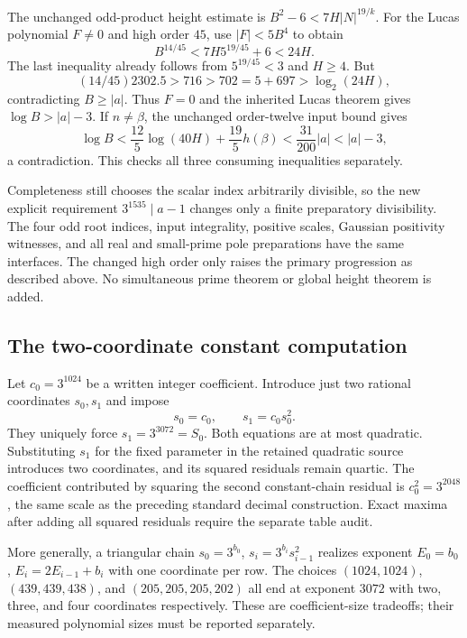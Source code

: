 The unchanged odd-product height estimate is
$B^2-6<7H|N|^{19/k}$. For the Lucas polynomial $F\ne0$ and high
order $45$, use $|F|<5B^4$ to obtain
\[
 B^{14/45}<7H5^{19/45}+6<24H.
\]
The last inequality already follows from $5^{19/45}<3$ and $H\ge4$.
But
\[
 (14/45)2302.5>716>702=5+697>\log_2(24H),
\]
contradicting $B\ge|a|$. Thus $F=0$ and the inherited Lucas theorem
gives $\log B>|a|-3$. If $n\ne\beta$, the unchanged order-twelve
input bound gives
\[
 \log B<\frac{12}{5}\log(40H)+\frac{19}{5}h(\beta)
 <\frac{31}{200}|a|<|a|-3,
\]
a contradiction. This checks all three consuming inequalities separately.

Completeness still chooses the scalar index arbitrarily divisible,
so the new explicit requirement $3^{1535}\mid a-1$ changes only a
finite preparatory divisibility. The four odd root indices, input
integrality, positive scales, Gaussian positivity witnesses, and all
real and small-prime pole preparations have the same interfaces.
The changed high order only raises the primary progression as described
above. No simultaneous prime theorem or global height theorem is added.

\subsection{The two-coordinate constant computation}

Let $c_0=3^{1024}$ be a written integer coefficient. Introduce just
two rational coordinates $s_0,s_1$ and impose
\[
 s_0=c_0,\qquad s_1=c_0s_0^2.
\]
They uniquely force $s_1=3^{3072}=S_0$. Both equations are at most
quadratic. Substituting $s_1$ for the fixed parameter in the retained
quadratic source introduces two coordinates, and its squared residuals
remain quartic. The coefficient contributed by squaring the second
constant-chain residual is $c_0^2=3^{2048}$, the same scale as the
preceding standard decimal construction. Exact maxima after adding
all squared residuals require the separate table audit.

More generally, a triangular chain
$s_0=3^{b_0}$, $s_i=3^{b_i}s_{i-1}^2$ realizes exponent
$E_0=b_0$, $E_i=2E_{i-1}+b_i$ with one coordinate per row.
The choices $(1024,1024)$, $(439,439,438)$, and
$(205,205,205,202)$ all end at exponent $3072$ with two, three,
and four coordinates respectively. These are coefficient-size tradeoffs;
their measured polynomial sizes must be reported separately.
